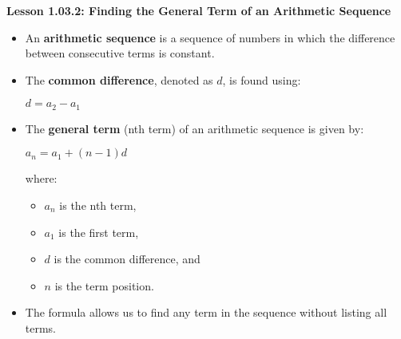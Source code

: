 \begin{center}
\textbf{Lesson 1.03.2: Finding the General Term of an Arithmetic Sequence}
\end{center}

\vspace*{-1.5ex}

\begin{itemize}
    \item An \textbf{arithmetic sequence} is a sequence of numbers in which the difference between consecutive terms is constant.
    \item The \textbf{common difference}, denoted as $d$, is found using:

{\centering $  d = a_2 - a_1  $\par}
    \item The \textbf{general term} (nth term) of an arithmetic sequence is given by:

{\centering $  a_n = a_1 + (n-1)d  $\par}
\noindent     where:
    \begin{itemize}
        \item $a_n$ is the nth term,
        \item $a_1$ is the first term,
        \item $d$ is the common difference, and
        \item $n$ is the term position.
    \end{itemize}
    \item The formula allows us to find any term in the sequence without listing all terms.
\end{itemize}
